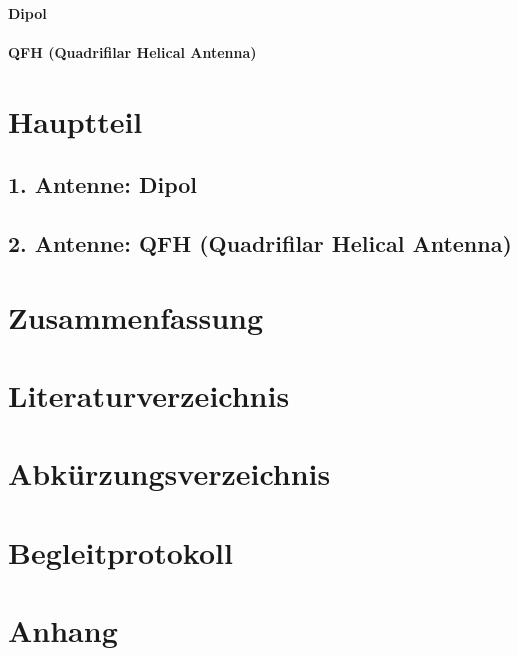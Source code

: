 \documentclass[12pt]{scrreprt}
\begin{document}
	\subsubsection{Dipol}
		
	\subsubsection{QFH (Quadrifilar Helical Antenna)}
	

	
	\pagebreak
	
	\chapter{Hauptteil}
	\section{1. Antenne: Dipol}
	
	\section{2. Antenne: QFH (Quadrifilar Helical Antenna)}
	
	
	\pagebreak
	
	\chapter{Zusammenfassung}
	\pagebreak
	
	\chapter{Literaturverzeichnis}
	\pagebreak
	
	\chapter{Abkürzungsverzeichnis}
	\pagebreak
	
	\chapter{Begleitprotokoll}
	
	\chapter{Anhang}
	
	

	
\end{document}
